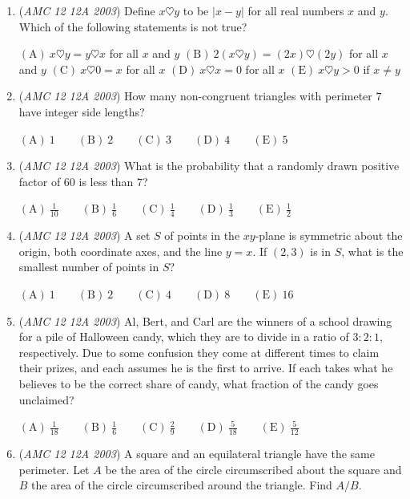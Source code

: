 \begin{enumerate}
	\item (\textit{AMC 12 12A 2003}) Define $x \heartsuit y$ to be $|x-y|$ for all real numbers $x$ and $y$. Which of the following statements is not true? 


 $\mathrm{(A) \ } x \heartsuit y = y \heartsuit x$ for all $x$ and $y$
$\mathrm{(B) \ } 2(x \heartsuit y) = (2x) \heartsuit (2y)$ for all $x$ and $y$
$\mathrm{(C) \ } x \heartsuit 0 = x$ for all $x$
$\mathrm{(D) \ } x \heartsuit x = 0$ for all $x$
$\mathrm{(E) \ } x \heartsuit y > 0$ if $x \neq y$


	\item (\textit{AMC 12 12A 2003}) How many non-congruent triangles with perimeter $7$ have integer side lengths? 


 $\mathrm{(A) \ } 1\qquad \mathrm{(B) \ } 2\qquad \mathrm{(C) \ } 3\qquad \mathrm{(D) \ } 4\qquad \mathrm{(E) \ } 5$


	\item (\textit{AMC 12 12A 2003}) What is the probability that a randomly drawn positive factor of $60$ is less than $7$?


 $\mathrm{(A) \ } \frac{1}{10}\qquad \mathrm{(B) \ } \frac{1}{6}\qquad \mathrm{(C) \ } \frac{1}{4}\qquad \mathrm{(D) \ } \frac{1}{3}\qquad \mathrm{(E) \ } \frac{1}{2}$


	\item (\textit{AMC 12 12A 2003}) A set $S$ of points in the $xy$-plane is symmetric about the origin, both coordinate axes, and the line $y=x$. If $(2,3)$ is in $S$, what is the smallest number of points in $S$?


 $\mathrm{(A) \ } 1\qquad \mathrm{(B) \ } 2\qquad \mathrm{(C) \ } 4\qquad \mathrm{(D) \ } 8\qquad \mathrm{(E) \ } 16$


	\item (\textit{AMC 12 12A 2003}) Al, Bert, and Carl are the winners of a school drawing for a pile of Halloween candy, which they are to divide in a ratio of $3:2:1$, respectively. Due to some confusion they come at different times to claim their prizes, and each assumes he is the first to arrive. If each takes what he believes to be the correct share of candy, what fraction of the candy goes unclaimed?


 $\mathrm{(A) \ } \frac{1}{18}\qquad \mathrm{(B) \ } \frac{1}{6}\qquad \mathrm{(C) \ } \frac{2}{9}\qquad \mathrm{(D) \ } \frac{5}{18}\qquad \mathrm{(E) \ } \frac{5}{12}$


	\item (\textit{AMC 12 12A 2003}) A square and an equilateral triangle have the same perimeter. Let $A$ be the area of the circle circumscribed about the square and $B$ the area of the circle circumscribed around the triangle. Find $A/B$.



\end{enumerate}
